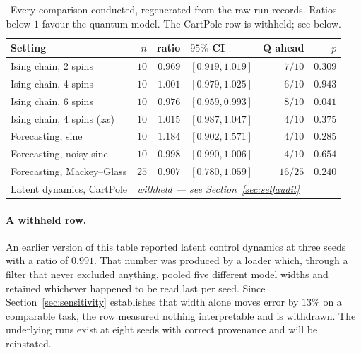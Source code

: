 \documentclass[11pt,onecolumn]{article}
\newif\ifdraft
\newcommand{\pend}[1]{%
  \ifdraft\textcolor{PendFG}{\textbf{[}\textit{#1}\textbf{]}}\fi}
\begin{document}
\begin{table}[htb]\centering\small
\caption{Every comparison conducted, regenerated from the raw run
records. Ratios below $1$ favour the quantum model. The CartPole row is
withheld; see below.}
\label{tab:forest}
\begin{tabular}{lrrlrr}
\toprule
Setting & $n$ & ratio & $95\%$ CI & Q ahead & $p$ \\
\midrule
Ising chain, 2 spins           & $10$ & $0.969$ & $[0.919, 1.019]$ & $7/10$ & $0.309$ \\
Ising chain, 4 spins           & $10$ & $1.001$ & $[0.979, 1.025]$ & $6/10$ & $0.943$ \\
Ising chain, 6 spins           & $10$ & $0.976$ & $\mathbf{[0.959, 0.993]}$ & $8/10$ & $\mathbf{0.041}$ \\
Ising chain, 4 spins ($zx$)    & $10$ & $1.015$ & $[0.987, 1.047]$ & $4/10$ & $0.375$ \\
Forecasting, sine              & $10$ & $1.184$ & $[0.902, 1.571]$ & $4/10$ & $0.285$ \\
Forecasting, noisy sine        & $10$ & $0.998$ & $[0.990, 1.006]$ & $4/10$ & $0.654$ \\
Forecasting, Mackey--Glass     & $25$ & $0.907$ & $[0.780, 1.059]$ & $16/25$ & $0.240$ \\
\midrule
Latent dynamics, CartPole      & \multicolumn{5}{l}{\emph{withheld --- see Section~\ref{sec:selfaudit}}} \\
\bottomrule
\end{tabular}
\end{table}

\paragraph{A withheld row.}
An earlier version of this table reported latent control dynamics at
three seeds with a ratio of $0.991$. That number was produced by a
loader which, through a filter that never excluded anything, pooled five
different model widths and retained whichever happened to be read last
per seed. Since Section~\ref{sec:sensitivity} establishes that width
alone moves error by $13\%$ on a comparable task, the row measured
nothing interpretable and is withdrawn. The underlying runs exist at
eight seeds with correct provenance and will be reinstated.
\pend{reinstate from the Phase 1 records: at $d_{\mathrm{model}}=32$,
$K=4$ the ratio is $0.988$ ($p = 0.29$, ahead $5/8$) and at $K=8$ it is
$0.975$ ($p = 0.041$, ahead $6/8$); choose one context and state it}
\end{document}
